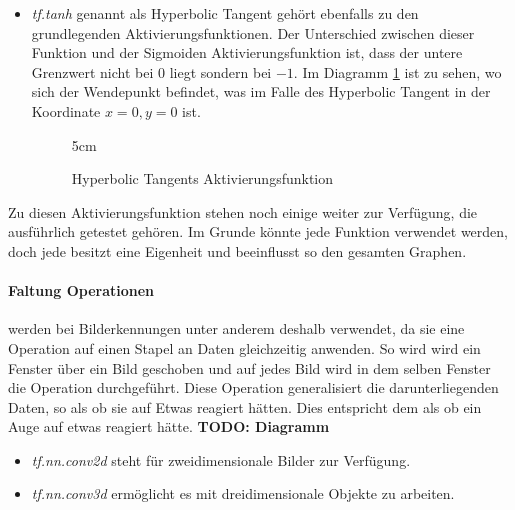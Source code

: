 \begin{itemize}
	\item \textit{tf.tanh} genannt als Hyperbolic Tangent gehört ebenfalls zu den grundlegenden Aktivierungsfunktionen. 
	Der Unterschied zwischen dieser Funktion und der Sigmoiden Aktivierungsfunktion ist, dass der untere Grenzwert nicht bei $0$ liegt sondern bei $-1$. 
	Im Diagramm \ref{fig:Hyperbolic Tangents Aktivierungsfunktion} ist zu sehen, wo sich der Wendepunkt befindet, was im Falle des Hyperbolic Tangent in der Koordinate $x = 0, y = 0$ ist. 
\begin{figure}
	\centering
	\resizebox {\linewidth} {5cm} {
	}
	\caption{Hyperbolic Tangents Aktivierungsfunktion}
	\label{fig:Hyperbolic Tangents Aktivierungsfunktion}
\end{figure}
\end{itemize}
\phantom \newline

\noindent
Zu diesen Aktivierungsfunktion stehen noch einige weiter zur Verfügung, die ausführlich getestet gehören. 
Im Grunde könnte jede Funktion verwendet werden, doch jede besitzt eine Eigenheit und beeinflusst so den gesamten Graphen. 

\paragraph{Faltung Operationen} werden bei Bilderkennungen unter anderem deshalb verwendet, da sie eine Operation auf einen Stapel an Daten gleichzeitig anwenden. 
So wird wird ein Fenster über ein Bild geschoben und auf jedes Bild wird in dem selben Fenster die Operation durchgeführt. 
Diese Operation generalisiert die darunterliegenden Daten, so als ob sie auf Etwas reagiert hätten. 
Dies entspricht dem als ob ein Auge auf etwas reagiert hätte. 
\textbf{TODO: Diagramm}
\begin{itemize}
	\item \textit{tf.nn.conv2d} steht für zweidimensionale Bilder zur Verfügung. 
	\item \textit{tf.nn.conv3d} ermöglicht es mit dreidimensionale Objekte zu arbeiten.
\end{itemize}
\phantom \newline

